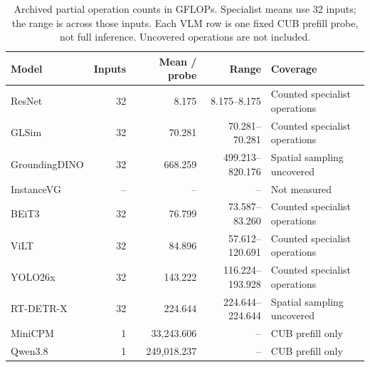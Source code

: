 \begin{table}[H]
\centering
\caption{Archived partial operation counts in GFLOPs. Specialist means use 32 inputs; the range is across those inputs. Each VLM row is one fixed CUB prefill probe, not full inference. Uncovered operations are not included.}
\label{tab:cost}
\small
\setlength{\tabcolsep}{6pt}
\begin{tabular}{@{}lrrrl@{}}
\toprule
\rowcolor{valfill} Model & Inputs & Mean / probe & Range & Coverage\\
\midrule
ResNet & 32 & 8.175 & 8.175--8.175 & Counted specialist operations\\
GLSim & 32 & 70.281 & 70.281--70.281 & Counted specialist operations\\
GroundingDINO & 32 & 668.259 & 499.213--820.176 & Spatial sampling uncovered\\
InstanceVG & -- & -- & -- & Not measured\\
BEiT3 & 32 & 76.799 & 73.587--83.260 & Counted specialist operations\\
ViLT & 32 & 84.896 & 57.612--120.691 & Counted specialist operations\\
YOLO26x & 32 & 143.222 & 116.224--193.928 & Counted specialist operations\\
RT-DETR-X & 32 & 224.644 & 224.644--224.644 & Spatial sampling uncovered\\
\midrule
MiniCPM & 1 & 33,243.606 & -- & CUB prefill only\\
Qwen3.8 & 1 & 249,018.237 & -- & CUB prefill only\\
\bottomrule
\end{tabular}
\end{table}
